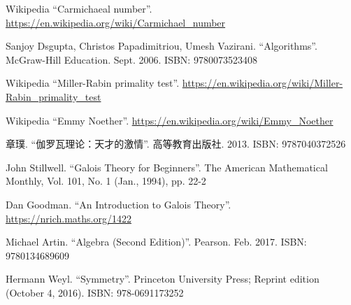 \documentclass[b5paper]{article}
\begin{document}
\begin{thebibliography}{99}
Wikipedia ``Carmichaeal number''. \url{https://en.wikipedia.org/wiki/Carmichael_number}

Sanjoy Dsgupta, Christos Papadimitriou, Umesh Vazirani. ``Algorithms''. McGraw-Hill Education. Sept. 2006. ISBN: 9780073523408

Wikipedia ``Miller-Rabin primality test''. \url{https://en.wikipedia.org/wiki/Miller-Rabin_primality_test}

Wikipedia ``Emmy Noether''. \url{https://en.wikipedia.org/wiki/Emmy_Noether}

{\fontspec{\cnmainft}章璞. ``伽罗瓦理论：天才的激情''. 高等教育出版社.} 2013. ISBN: 9787040372526

John Stillwell. ``Galois Theory for Beginners''. The American Mathematical Monthly, Vol. 101, No. 1 (Jan., 1994), pp. 22-2

Dan Goodman. ``An Introduction to Galois Theory''. \url{https://nrich.maths.org/1422}

Michael Artin. ``Algebra (Second Edition)''. Pearson. Feb. 2017. ISBN: 9780134689609

Hermann Weyl. ``Symmetry''. Princeton University Press; Reprint edition (October 4, 2016). ISBN: 978-0691173252

\end{thebibliography}

\expandafter\enddocument

\fi
\end{document}
